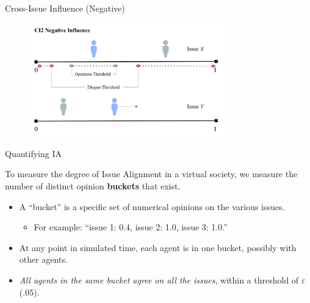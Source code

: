 \documentclass[12pt]{beamer}
\begin{document}
\begin{frame}[c]{Cross-Issue Influence (Negative)}  %



\begin{figure}
	\includegraphics[width=0.75\textwidth]{images/CI2Negative.png}
\end{figure}

\end{frame}
\begin{frame}[c]{Quantifying IA} %

To measure the degree of Issue Alignment in a virtual society, we measure the
number of distinct opinion \textbf{buckets} that exist.

\bigskip
\pause
\begin{itemize}
\itemsep.1em

\item A ``bucket'' is a specific set of numerical opinions on the various issues.
\begin{itemize}
\itemsep.1em
\item For example: ``issue 1: 0.4, issue 2: 1.0, issue 3: 1.0.''
\end{itemize}

\pause

\item At any point in simulated time, each agent is in one bucket, possibly with
other agents.

\pause
\item \textit{All agents in the same bucket agree on all the issues}, within a
threshold of $\varepsilon$ (.05).

\end{itemize}
\end{frame}
\end{document}

